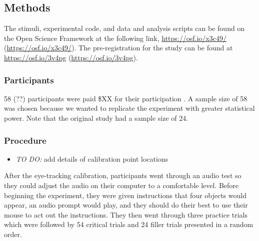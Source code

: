 \documentclass[
  english,
  man,floatsintext]{apa6}
\providecommand{\tightlist}{%
  \setlength{\itemsep}{0pt}\setlength{\parskip}{0pt}}
\begin{document}
\hypertarget{methods-3}{%
\subsection{Methods}\label{methods-3}}

The stimuli, experimental code, and data and analysis scripts can be found on the Open Science Framework at the following link, \url{https://osf.io/x3c49/} (\url{https://osf.io/x3c49/}). The pre-registration for the study can be found at \url{https://osf.io/3v4pg} (\url{https://osf.io/3v4pg}).

\hypertarget{participants-4}{%
\subsubsection{Participants}\label{participants-4}}

58 (??) participants were paid \$XX for their participation . A sample size of 58 was chosen because we wanted to replicate the experiment with greater statistical power. Note that the original study had a sample size of 24.

\hypertarget{procedure-3}{%
\subsubsection{Procedure}\label{procedure-3}}

\begin{itemize}
\tightlist
\item
  \emph{TO DO:} add details of calibration point locations
\end{itemize}

After the eye-tracking calibration, participants went through an audio test so they could adjust the audio on their computer to a comfortable level. Before beginning the experiment, they were given instructions that four objects would appear, an audio prompt would play, and they should do their best to use their mouse to act out the instructions. They then went through three practice trials which were followed by 54 critical trials and 24 filler trials presented in a random order.
\end{document}
